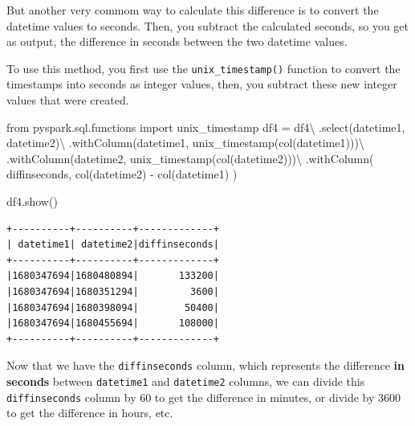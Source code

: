 \documentclass[
  11pt,
  letterpaper,
  DIV=11,
  numbers=noendperiod]{scrreprt}
\newenvironment{Shaded}{\begin{snugshade}}{\end{snugshade}}
\newcommand{\ImportTok}[1]{\textcolor[rgb]{0.00,0.46,0.62}{#1}}
\newcommand{\NormalTok}[1]{\textcolor[rgb]{0.00,0.23,0.31}{#1}}
\newcommand{\OperatorTok}[1]{\textcolor[rgb]{0.37,0.37,0.37}{#1}}
\newcommand{\StringTok}[1]{\textcolor[rgb]{0.13,0.47,0.30}{#1}}
\begin{document}
But another very commom way to calculate this difference is to convert
the datetime values to seconds. Then, you subtract the calculated
seconds, so you get as output, the difference in seconds between the two
datetime values.

To use this method, you first use the \texttt{unix\_timestamp()}
function to convert the timestamps into seconds as integer values, then,
you subtract these new integer values that were created.

\begin{Shaded}
\begin{Highlighting}[]
\ImportTok{from}\NormalTok{ pyspark.sql.functions }\ImportTok{import}\NormalTok{ unix\_timestamp}
\NormalTok{df4 }\OperatorTok{=}\NormalTok{ df4}\OperatorTok{\textbackslash{}}
\NormalTok{    .select(}\StringTok{\textquotesingle{}datetime1\textquotesingle{}}\NormalTok{, }\StringTok{\textquotesingle{}datetime2\textquotesingle{}}\NormalTok{)}\OperatorTok{\textbackslash{}}
\NormalTok{    .withColumn(}\StringTok{\textquotesingle{}datetime1\textquotesingle{}}\NormalTok{, unix\_timestamp(col(}\StringTok{\textquotesingle{}datetime1\textquotesingle{}}\NormalTok{)))}\OperatorTok{\textbackslash{}}
\NormalTok{    .withColumn(}\StringTok{\textquotesingle{}datetime2\textquotesingle{}}\NormalTok{, unix\_timestamp(col(}\StringTok{\textquotesingle{}datetime2\textquotesingle{}}\NormalTok{)))}\OperatorTok{\textbackslash{}}
\NormalTok{    .withColumn(}
        \StringTok{\textquotesingle{}diffinseconds\textquotesingle{}}\NormalTok{,}
\NormalTok{        col(}\StringTok{\textquotesingle{}datetime2\textquotesingle{}}\NormalTok{) }\OperatorTok{{-}}\NormalTok{ col(}\StringTok{\textquotesingle{}datetime1\textquotesingle{}}\NormalTok{)}
\NormalTok{    )}

\NormalTok{df4.show()}
\end{Highlighting}
\end{Shaded}

\begin{verbatim}
+----------+----------+-------------+
| datetime1| datetime2|diffinseconds|
+----------+----------+-------------+
|1680347694|1680480894|       133200|
|1680347694|1680351294|         3600|
|1680347694|1680398094|        50400|
|1680347694|1680455694|       108000|
+----------+----------+-------------+
\end{verbatim}

Now that we have the \texttt{diffinseconds} column, which represents the
difference \textbf{in seconds} between \texttt{datetime1} and
\texttt{datetime2} columns, we can divide this \texttt{diffinseconds}
column by 60 to get the difference in minutes, or divide by 3600 to get
the difference in hours, etc.
\end{document}
